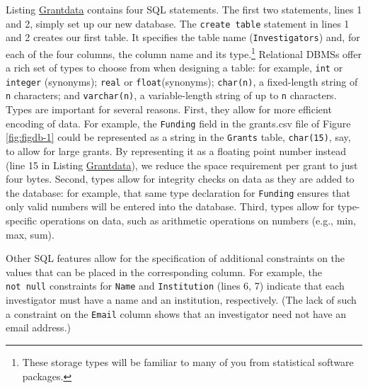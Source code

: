 \documentclass[]{krantz}
\begin{document}
Listing \protect\hyperlink{list:db1}{Grantdata} contains four SQL
statements. The first two statements, lines 1 and 2, simply set up our
new database. The \texttt{create\ table} statement in lines 1 and 2
creates our first table. It specifies the table name
(\texttt{Investigators}) and, for each of the four columns, the column
name and its type.\footnote{These storage types will be familiar to many
  of you from statistical software packages.} Relational DBMSs offer a
rich set of types to choose from when designing a table: for example,
\texttt{int} or \texttt{integer} (synonyms); \texttt{real} or
\texttt{float}(synonyms); \texttt{char(n)}, a fixed-length string of
\texttt{n} characters; and \texttt{varchar(n)}, a variable-length string
of up to \texttt{n} characters. Types are important for several reasons.
First, they allow for more efficient encoding of data. For example, the
\texttt{Funding} field in the grants.csv file of Figure
\ref{fig:figdb-1} could be represented as a string in the
\texttt{Grants} table, \texttt{char(15)}, say, to allow for large
grants. By representing it as a floating point number instead (line 15
in Listing \protect\hyperlink{list:db1}{Grantdata}), we reduce the space
requirement per grant to just four bytes. Second, types allow for
integrity checks on data as they are added to the database: for example,
that same type declaration for \texttt{Funding} ensures that only valid
numbers will be entered into the database. Third, types allow for
type-specific operations on data, such as arithmetic operations on
numbers (e.g., min, max, sum).

Other SQL features allow for the specification of additional constraints
on the values that can be placed in the corresponding column. For
example, the \texttt{not\ null} constraints for \texttt{Name} and
\texttt{Institution} (lines 6, 7) indicate that each investigator must
have a name and an institution, respectively. (The lack of such a
constraint on the \texttt{Email} column shows that an investigator need
not have an email address.)
\end{document}
